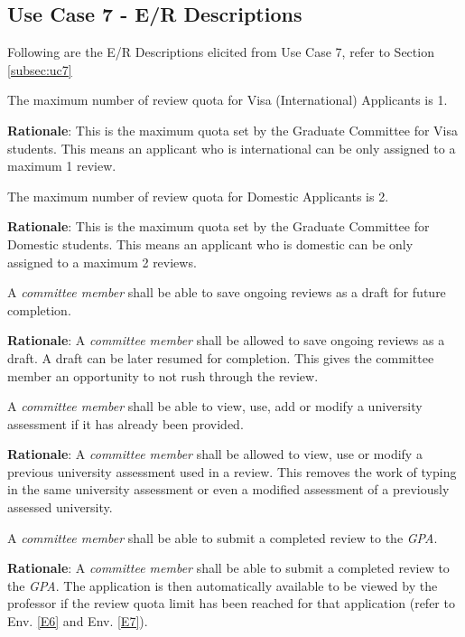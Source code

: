 \documentclass[fontsize=12pt,paper=letter,twoside]{scrartcl}
\begin{document}
\subsection{Use Case 7 - E/R Descriptions}

Following are the E/R Descriptions elicited from Use Case 7, refer to Section \ref{subsec:uc7}

\genenv
{The maximum number of review quota for Visa (International) Applicants is 1.}

\smallskip
\noindent \textbf{Rationale}: This is the maximum quota set by the Graduate Committee for Visa students. This means an applicant who is international can be only assigned to a maximum 1 review.
\label{E6}

\genenv
{The maximum number of review quota for Domestic Applicants is 2.}
\label{E7}

\smallskip
\noindent \textbf{Rationale}: This is the maximum quota set by the Graduate Committee for Domestic students. This means an applicant who is domestic can be only assigned to a maximum 2 reviews.

\genreq
{A \emph{committee member} shall be able to save ongoing reviews as a draft for future completion.\\}
{}
\label{R26}

\smallskip
\noindent \textbf{Rationale}: A \emph{committee member} shall be allowed to save ongoing reviews as a draft. A draft can be later resumed for completion. This gives the committee member an opportunity to not rush through the review.

\genreq
{A \emph{committee member} shall be able to view, use, add or modify a university assessment if it has already been provided.\\}
{}
\label{R27}

\smallskip
\noindent \textbf{Rationale}: A \emph{committee member} shall be allowed to view, use or modify a previous university assessment used in a review. This removes the work of typing in the same university assessment or even a modified assessment of a previously assessed university.

\rdescription
{A \emph{committee member} shall be able to submit a completed review to the \emph{GPA}.\\}
{}
\label{R28}

\smallskip
\noindent \textbf{Rationale}: A \emph{committee member} shall be able to submit a completed review to the \emph{GPA}. The application is then automatically available to be viewed by the professor if the review quota limit has been reached for that application (refer to Env. \ref{E6} and Env. \ref{E7}).
\end{document}
